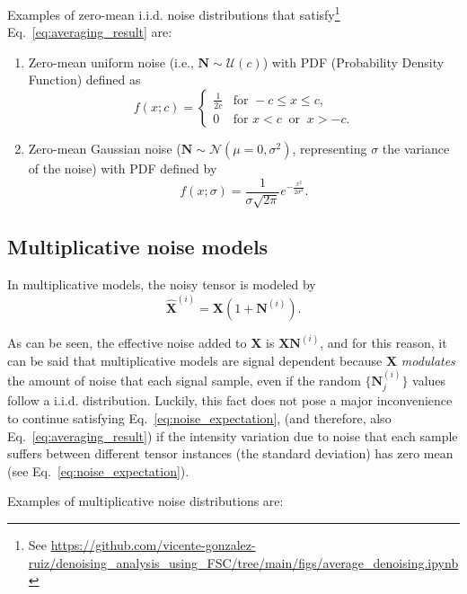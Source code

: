 \documentclass{article}
\begin{document}
Examples of zero-mean i.i.d. noise distributions that
satisfy\footnote{See
  \url{https://github.com/vicente-gonzalez-ruiz/denoising_analysis_using_FSC/tree/main/figs/average_denoising.ipynb}}
Eq.~\ref{eq:averaging_result} are:
\begin{enumerate}
\item Zero-mean uniform noise (i.e., ${\mathbf N}\sim{\mathcal U}(c)$) with
  PDF (Probability Density Function) defined as
  \begin{equation}
    f(x; c) = \begin{cases}
      \frac{1}{2c} & \text{for } -c \le x \le c, \\[8pt]
      0 & \text{for } x < c \ \text{ or } \ x > -c.
    \end{cases}
  \end{equation}
\item Zero-mean Gaussian noise
  (${\mathbf N}\sim{\mathcal N}(\mu=0,\sigma^2)$, representing
  $\sigma$ the variance of the noise) with PDF defined by
  \begin{equation}
    f(x; \sigma) = \frac 1 {\sigma\sqrt{2\pi}} e^{-\frac{x^2}{2\sigma^2} }.
  \end{equation}
\end{enumerate}

\subsection{Multiplicative noise models}
In multiplicative models, the noisy tensor is modeled by
\begin{equation}
  \hat{\mathbf X}^{(i)} = {\mathbf X} (1 + {\mathbf N}^{(i)}).
  \label{eq:multiplicative_noisy_model}
\end{equation}

As can be seen, the effective noise added to ${\mathbf X}$ is
${\mathbf X}{\mathbf N}^{(i)}$, and for this reason, it can be said
that multiplicative models are signal dependent because ${\mathbf X}$
\emph{modulates} the amount of noise that each signal sample, even if
the random $\{{\mathbf N}^{(i)}_j\}$ values follow a
i.i.d. distribution. Luckily, this fact does not pose a major
inconvenience to continue satisfying Eq.~\ref{eq:noise_expectation},
(and therefore, also Eq.~\ref{eq:averaging_result}) if the intensity
variation due to noise that each sample suffers between different
tensor instances (the standard deviation) has zero mean (see
Eq.~\ref{eq:noise_expectation}).

Examples of multiplicative noise distributions are:
\end{document}

